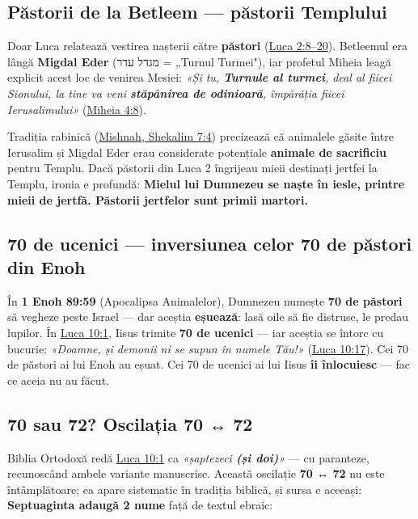 \documentclass[12pt,a4paper,twoside,openany]{book}
\begin{document}
\subsection{Păstorii de la Betleem — păstorii Templului}
Doar Luca relatează vestirea nașterii către \textbf{păstori} (\href{https://bibliaortodoxa.ro/carte.php?id=48\&cap=2\#8}{Luca 2:8–20}). Betleemul era lângă \textbf{Migdal Eder} (מגדל עדר = „Turnul Turmei"), iar profetul Miheia leagă explicit acest loc de venirea Mesiei: \textit{«Și tu, \textbf{Turnule al turmei}, deal al fiicei Sionului, la tine va veni \textbf{stăpânirea de odinioară}, împărăția fiicei Ierusalimului»} (\href{https://bibliaortodoxa.ro/carte.php?id=53\&cap=4\#8}{Miheia 4:8}).

Tradiția rabinică (\href{https://www.sefaria.org/Mishnah_Shekalim.7.4}{Mishnah, Shekalim 7:4}) precizează că animalele găsite între Ierusalim și Migdal Eder erau considerate potențiale \textbf{animale de sacrificiu} pentru Templu. Dacă păstorii din Luca 2 îngrijeau mieii destinați jertfei la Templu, ironia e profundă: \textbf{Mielul lui Dumnezeu se naște în iesle, printre mieii de jertfă. Păstorii jertfelor sunt primii martori.}


\subsection{70 de ucenici — inversiunea celor 70 de păstori din Enoh}
În \textbf{1 Enoh 89:59} (Apocalipsa Animalelor), Dumnezeu numește \textbf{70 de păstori} să vegheze peste Israel — dar aceștia \textbf{eșuează}: lasă oile să fie distruse, le predau lupilor. În \href{https://bibliaortodoxa.ro/carte.php?id=48\&cap=10\#1}{Luca 10:1}, Iisus trimite \textbf{70 de ucenici} — iar aceștia se întorc cu bucurie: \textit{«Doamne, și demonii ni se supun în numele Tău!»} (\href{https://bibliaortodoxa.ro/carte.php?id=48\&cap=10\#17}{Luca 10:17}). Cei 70 de păstori ai lui Enoh au eșuat. Cei 70 de ucenici ai lui Iisus \textbf{îi înlocuiesc} — fac ce aceia nu au făcut.


\subsection{70 sau 72? Oscilația 70 ↔ 72}
Biblia Ortodoxă redă \href{https://bibliaortodoxa.ro/carte.php?id=48\&cap=10\#1}{Luca 10:1} ca \textit{«șaptezeci \textbf{(și doi)}»} — cu paranteze, recunoscând ambele variante manuscrise. Această oscilație \textbf{70 ↔ 72} nu este întâmplătoare; ea apare sistematic în tradiția biblică, și sursa e aceeași: \textbf{Septuaginta adaugă 2 nume} față de textul ebraic:
\end{document}
